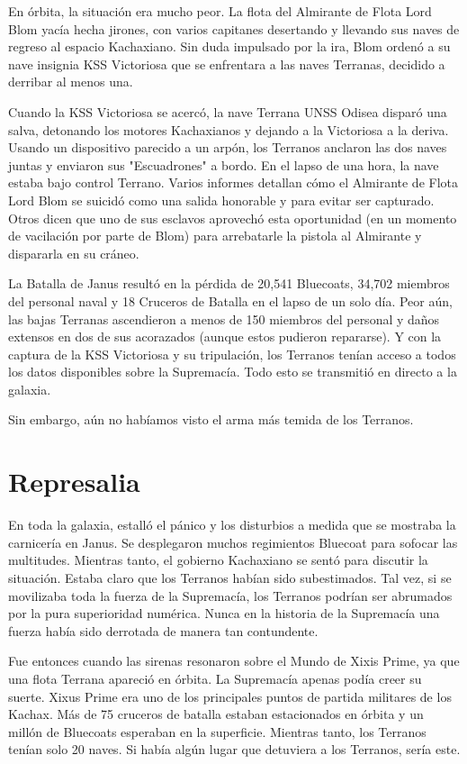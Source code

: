 \documentclass[spanish,12pt,a4paper,oneside,titlepage, twocolumn]{article}
\begin{document}
    En órbita, la situación era mucho peor. La flota del Almirante de Flota Lord Blom yacía hecha jirones, con varios capitanes desertando y llevando sus naves de regreso al espacio Kachaxiano. Sin duda impulsado por la ira, Blom ordenó a su nave insignia KSS Victoriosa que se enfrentara a las naves Terranas, decidido a derribar al menos una.

    Cuando la KSS Victoriosa se acercó, la nave Terrana UNSS Odisea disparó una salva, detonando los motores Kachaxianos y dejando a la Victoriosa a la deriva. Usando un dispositivo parecido a un arpón, los Terranos anclaron las dos naves juntas y enviaron sus "Escuadrones" a bordo. En el lapso de una hora, la nave estaba bajo control Terrano. Varios informes detallan cómo el Almirante de Flota Lord Blom se suicidó como una salida honorable y para evitar ser capturado. Otros dicen que uno de sus esclavos aprovechó esta oportunidad (en un momento de vacilación por parte de Blom) para arrebatarle la pistola al Almirante y dispararla en su cráneo.

    La Batalla de Janus resultó en la pérdida de 20,541 Bluecoats, 34,702 miembros del personal naval y 18 Cruceros de Batalla en el lapso de un solo día. Peor aún, las bajas Terranas ascendieron a menos de 150 miembros del personal y daños extensos en dos de sus acorazados (aunque estos pudieron repararse). Y con la captura de la KSS Victoriosa y su tripulación, los Terranos tenían acceso a todos los datos disponibles sobre la Supremacía. Todo esto se transmitió en directo a la galaxia.

    Sin embargo, aún no habíamos visto el arma más temida de los Terranos.

    \section*{\centering Represalia}

    En toda la galaxia, estalló el pánico y los disturbios a medida que se mostraba la carnicería en Janus. Se desplegaron muchos regimientos Bluecoat para sofocar las multitudes. Mientras tanto, el gobierno Kachaxiano se sentó para discutir la situación. Estaba claro que los Terranos habían sido subestimados. Tal vez, si se movilizaba toda la fuerza de la Supremacía, los Terranos podrían ser abrumados por la pura superioridad numérica. Nunca en la historia de la Supremacía una fuerza había sido derrotada de manera tan contundente.

    Fue entonces cuando las sirenas resonaron sobre el Mundo de Xixis Prime, ya que una flota Terrana apareció en órbita. La Supremacía apenas podía creer su suerte. Xixus Prime era uno de los principales puntos de partida militares de los Kachax. Más de 75 cruceros de batalla estaban estacionados en órbita y un millón de Bluecoats esperaban en la superficie. Mientras tanto, los Terranos tenían solo 20 naves. Si había algún lugar que detuviera a los Terranos, sería este.
\end{document}
